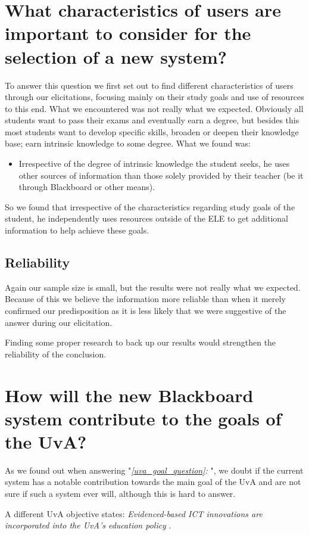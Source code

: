 \section{What characteristics of users are important to consider for the selection of a new system?}
To answer this question we first set out to find different characteristics of users through our elicitations, focusing mainly on their study goals and use of resources to this end. What we encountered was not really what we expected. Obviously all students want to pass their exams and eventually earn a degree, but besides this most students want to develop specific skills, broaden or deepen their knowledge base; earn intrinsic knowledge to some degree. What we found was:
\begin{itemize}
	\item Irrespective of the degree of intrinsic knowledge the student seeks, he uses other sources of information than those solely provided by their teacher (be it through Blackboard or other means).
\end{itemize}

So we found that irrespective of the characteristics regarding study goals of the student, he independently uses resources outside of the ELE to get additional information to help achieve these goals.

\subsection{Reliability}
Again our sample size is small, but the results were not really what we expected. Because of this we believe the information more reliable than when it merely confirmed our predisposition as it is less likely that we were suggestive of the answer during our elicitation.

Finding some proper research to back up our results would strengthen the reliability of the conclusion. 


\section{How will the new Blackboard system contribute to the goals of the UvA?}
As we found out when answering "\emph{\ref{uva_goal_question}: }", we doubt if the current system has a notable contribution towards the main goal of the UvA and are not sure if such a system ever will, although this is hard to answer.

A different UvA objective states: \emph{Evidenced-based ICT innovations are	incorporated into the UvA’s education policy} \cite{uva_strategic_plan}.

